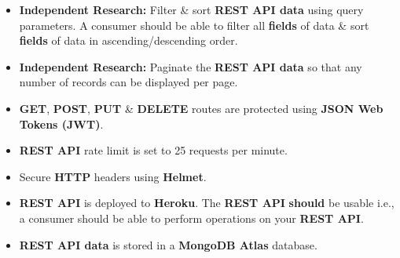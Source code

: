 \documentclass{article}
\begin{document}
\begin{itemize}
	\item \textbf{Independent Research:} Filter \& sort \textbf{REST API data} using query parameters. A consumer should be able to filter all \textbf{fields} of data \& sort \textbf{fields} of data in ascending/descending order.
	\item \textbf{Independent Research:} Paginate the \textbf{REST API data} so that any number of records can be displayed per page.
	\item \textbf{GET}, \textbf{POST}, \textbf{PUT} \& \textbf{DELETE} routes are protected using \textbf{JSON Web Tokens (JWT)}.
	\item \textbf{REST API} rate limit is set to 25 requests per minute.
	\item Secure \textbf{HTTP} headers using \textbf{Helmet}. 
	\item \textbf{REST API} is deployed to \textbf{Heroku}. The \textbf{REST API} \textbf{should} be usable i.e., a consumer should be able to perform operations on your \textbf{REST API}.
	\item \textbf{REST API data} is stored in a \textbf{MongoDB Atlas} database.
\end{itemize}
\end{document}
